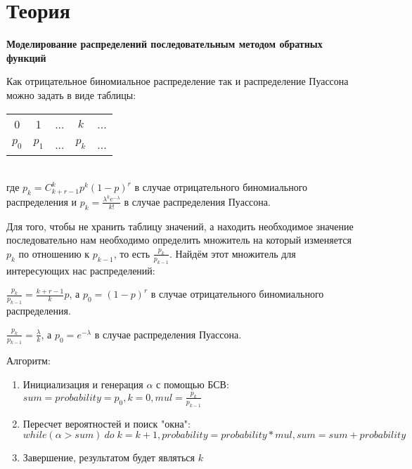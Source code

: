 \documentclass[12pt]{article}
\begin{document}
	\section*{Теория}
	\par \textbf{Моделирование распределений последовательным методом обратных функций} 
	\par Как отрицательное биномиальное распределение так и распределение Пуассона можно задать в виде таблицы: \par
	\begin{tabular}{c c c c c}
		\hline
		0 & 1 & ... & $ k $ & ... \\
		$ p_0 $ & $ p_1 $ & ... & $ p_k $ & ... \\
		\hline
	\end{tabular}
	\\ где $ p_k = C^{k}_{k+r-1}p^k(1-p)^r $ в случае отрицательного биномиального распределения и $ p_k = \frac{\lambda^ke^{-\lambda}}{k!} $ в случае распределения Пуассона.
	\par Для того, чтобы не хранить таблицу значений, а находить необходимое значение последовательно нам необходимо определить множитель на который изменяется $ p_k $ по отношению к $ p_{k-1} $, то есть $ \frac{p_k}{p_{k-1}} $. Найдём этот множитель для интересующих нас распределений:
	\par $ \frac{p_k}{p_{k-1}} = \frac{k+r-1}{k}p $, а $ p_0 = (1-p)^r $ в случае отрицательного биномиального распределения.
	\par $ \frac{p_k}{p_{k-1}} = \frac{\lambda}{k} $, а $ p_0 = e^{-\lambda} $ в случае распределения Пуассона.
	\par Алгоритм: \\
	\begin{enumerate}
		\item Инициализация и генерация $ \alpha $ с помощью БСВ: $ sum=probability=p_0, k=0, mul=\frac{p_k}{p_{k-1}} $
		\item Пересчет вероятностей и поиск "окна": $ while(\alpha > sum)\: do\; k=k+1, probability=probability*mul, sum=sum+probability $
		\item Завершение, результатом будет являться $ k $
	\end{enumerate}		
	
\end{document}
